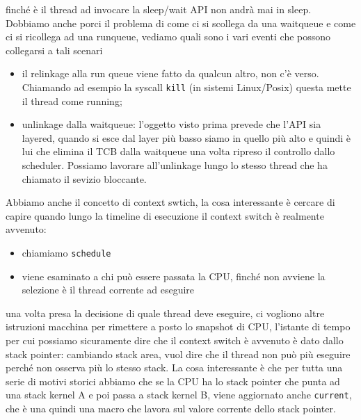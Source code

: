 \documentclass[12pt, oneside]{extbook}
\begin{document}
finché è il thread ad invocare la sleep/wait API non andrà mai in sleep.\\Dobbiamo anche porci il problema di come ci si scollega da una waitqueue e come ci si ricollega ad una runqueue, vediamo quali sono i vari eventi che possono collegarsi a tali scenari
\begin{itemize}
\item il relinkage alla run queue viene fatto da qualcun altro, non c'è verso. Chiamando ad esempio la syscall \texttt{kill} (in sistemi Linux/Posix) questa mette il thread come running;
\item unlinkage dalla waitqueue: l'oggetto visto prima prevede che l'API sia layered, quando si esce dal layer più basso siamo in quello più alto e quindi è lui che elimina il TCB dalla waitqueue una volta ripreso il controllo dallo scheduler. Possiamo lavorare all'unlinkage lungo lo stesso thread che ha chiamato il sevizio bloccante.
\end{itemize}
Abbiamo anche il concetto di context swtich, la cosa interessante è cercare di capire quando lungo la timeline di esecuzione il context switch è realmente avvenuto:
\begin{itemize}
\item chiamiamo \texttt{schedule}
\item viene esaminato a chi può essere passata la CPU, finché non avviene la selezione è il thread corrente ad eseguire
\end{itemize}
una volta presa la decisione di quale thread deve eseguire, ci vogliono altre istruzioni macchina per rimettere a posto lo snapshot di CPU, l'istante di tempo per cui possiamo sicuramente dire che il context switch è avvenuto è dato dallo stack pointer: cambiando stack area, vuol dire che il thread non può più eseguire perché non osserva più lo stesso stack. La cosa interessante è che per tutta una serie di motivi storici abbiamo che se la CPU ha lo stack pointer che punta ad una stack kernel A e poi passa a stack kernel B, viene aggiornato anche \texttt{current}, che è una quindi una macro che lavora sul valore corrente dello stack pointer.
\end{document}
